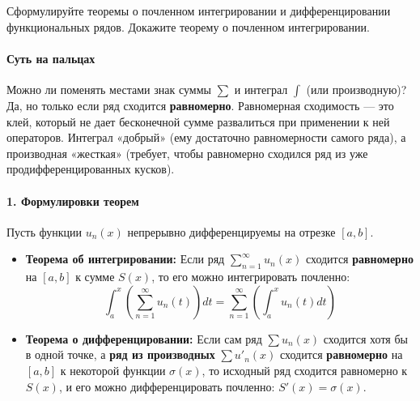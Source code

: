 
{Сформулируйте теоремы о почленном интегрировании и дифференцировании функциональных рядов. Докажите теорему о почленном интегрировании.}

\paragraph{Суть на пальцах}
Можно ли поменять местами знак суммы $\sum$ и интеграл $\int$ (или производную)? Да, но только если ряд сходится \textbf{равномерно}. Равномерная сходимость — это клей, который не дает бесконечной сумме развалиться при применении к ней операторов. Интеграл «добрый» (ему достаточно равномерности самого ряда), а производная «жесткая» (требует, чтобы равномерно сходился ряд из уже продифференцированных кусков).

\paragraph{1. Формулировки теорем}
Пусть функции $u_n(x)$ непрерывно дифференцируемы на отрезке $[a, b]$.
\begin{itemize}
    \item \textbf{Теорема об интегрировании:} Если ряд $\sum_{n=1}^{\infty} u_n(x)$ сходится \textbf{равномерно} на $[a, b]$ к сумме $S(x)$, то его можно интегрировать почленно:
    $$ \int_a^x \left( \sum_{n=1}^{\infty} u_n(t) \right) dt = \sum_{n=1}^{\infty} \left( \int_a^x u_n(t) dt \right) $$
    \item \textbf{Теорема о дифференцировании:} Если сам ряд $\sum u_n(x)$ сходится хотя бы в одной точке, а \textbf{ряд из производных} $\sum u'_n(x)$ сходится \textbf{равномерно} на $[a, b]$ к некоторой функции $\sigma(x)$, то исходный ряд сходится равномерно к $S(x)$, и его можно дифференцировать почленно: $S'(x) = \sigma(x)$.
\end{itemize}

